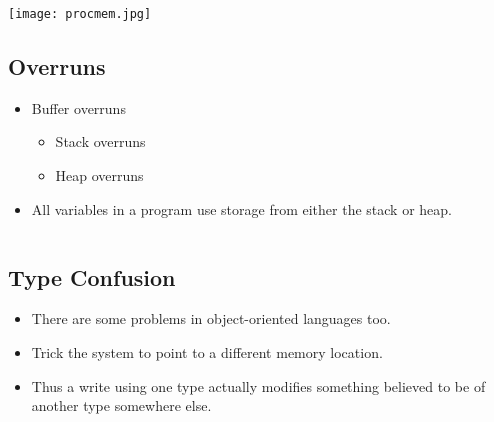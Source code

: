\begin{frame}
  \texttt{[image: procmem.jpg]}
\end{frame}

\subsection{Overruns}

\begin{frame}
  \begin{itemize}
    \item Buffer overruns
      \begin{itemize}
        \item Stack overruns
        \item Heap overruns
      \end{itemize}

    \item All variables in a program use storage from either the stack or heap.
  \end{itemize}
\end{frame}

\begin{frame}[fragile]
  \inputminted{C}{login.c}
\end{frame}



%

\subsection{Type Confusion}

\begin{frame}
  \begin{itemize}
    \item There are some problems in object-oriented languages too.
    \item Trick the system to point to a different memory location.
    \item Thus a write using one type actually modifies something believed to 
      be of another type somewhere else.
  \end{itemize}
\end{frame}


